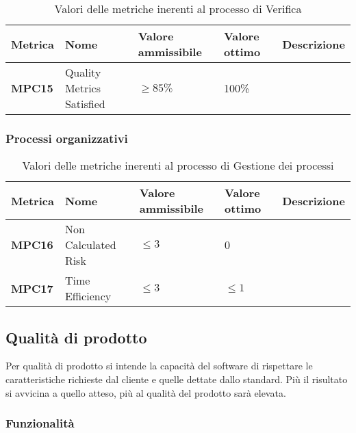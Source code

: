 \documentclass[italian,12pt]{article} %
\begin{document}

\begin{table}[h!]
	\centering
	\begin{tabularx}{\textwidth}{|X|X|X|X|X|} 	 
		\hline
		\textbf{Metrica} 	& \textbf{Nome} & \textbf{Valore ammissibile} & \textbf{Valore ottimo} & \textbf{Descrizione}\\  	 
		\hline
		\textbf{MPC15} & Quality Metrics Satisfied & $\geq 85\% $ & 100\% &\\
		\hline
	\end{tabularx}
	\caption{ Valori delle metriche inerenti al processo di Verifica}
	\label{table:5}
	\end{table}

\subsubsection{Processi organizzativi}


\begin{table}[h!]
	\centering
	\begin{tabularx}{\textwidth}{|X|X|X|X|X|} 	 
		\hline
		\textbf{Metrica} 	& \textbf{Nome} & \textbf{Valore ammissibile} & \textbf{Valore ottimo} & \textbf{Descrizione}\\  	 
		\hline
		\textbf{MPC16} & Non Calculated Risk & $\leq 3 $ & 0 &\\
		\hline
		\textbf{MPC17} & Time Efficiency & $\leq 3 $ & $\leq 1 $ &\\
		\hline
	\end{tabularx}
	\caption{ Valori delle metriche inerenti al processo di Gestione dei processi}
	\label{table:6}
	\end{table}


\subsection{Qualità di prodotto}

Per qualità di prodotto si intende la capacità del software di rispettare 
le caratteristiche richieste dal cliente e quelle dettate dallo standard.
Più il risultato si avvicina a quello atteso, più al qualità del prodotto
sarà elevata. 

\subsubsection{Funzionalità}
\end{document}
